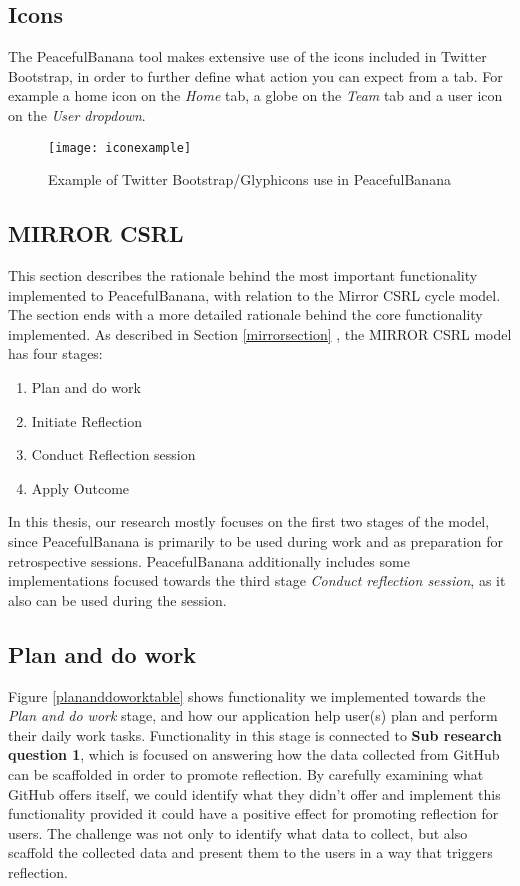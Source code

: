 \subsection{Icons}
The PeacefulBanana tool makes extensive use of the icons included in Twitter Bootstrap, in order to further define what action you can expect from a tab. For example a home icon on the \textit{Home} tab, a globe on the \textit{Team} tab and a user icon on the \textit{User dropdown}.
\begin{figure}[H]
\centering
	\texttt{[image: iconexample]}
\caption{Example of Twitter Bootstrap/Glyphicons use in PeacefulBanana \citep{twitterbootstrap}}
\label{iconexample}
\end{figure}

\subsection{MIRROR CSRL}
\label{subsec:mirrorcsrl}
This section describes the rationale behind the most important functionality implemented to PeacefulBanana, with relation to the Mirror CSRL cycle model. The section ends with a more detailed rationale behind the core functionality implemented. As described in Section \ref{mirrorsection} , the MIRROR CSRL model has four stages: 
\begin{enumerate}
    \item Plan and do work
    \item Initiate Reflection
    \item Conduct Reflection session
    \item Apply Outcome
\end{enumerate}
In this thesis, our research mostly focuses on the first two stages of the model, since PeacefulBanana is primarily to be used during work and as preparation for retrospective sessions. PeacefulBanana additionally includes some implementations focused towards the third stage \emph{Conduct reflection session}, as it also can be used during the session. 

\subsection{Plan and do work}
Figure \ref{plananddoworktable} shows functionality we implemented towards the \emph{Plan and do work} stage, and how our application help user(s) plan and perform their daily work tasks. 
Functionality in this stage is connected to \textbf{Sub research question 1}, which is focused on answering how the data collected from GitHub can be scaffolded in order to promote reflection. By carefully examining what GitHub offers itself, we could identify what they didn't offer and implement this functionality provided it could have a positive effect for promoting reflection for users. The challenge was not only to identify what data to collect, but also scaffold the collected data and present them to the users in a way that triggers reflection. 

